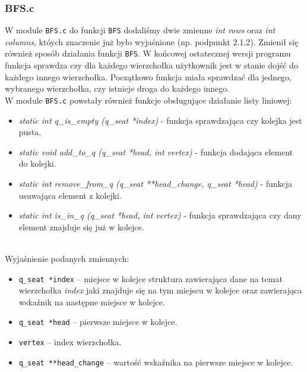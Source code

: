\documentclass[12pt, a4paper]{article}
\begin{document}
\subsubsection{BFS.c}
W module \texttt{BFS.c} do funkcji \texttt{BFS} dodaliśmy dwie zmienne \textit{int rows} oraz \textit{int columns}, któych znaczenie już było wyjaśnione (np. podpunkt 2.1.2). Zmienił się również sposób działania funkcji \texttt{BFS}. W końcowej ostatecznej wersji programu funkcja sprawdza czy dla każdego wierzchołka użytkownik jest w stanie dojść do każdego innego wierzchołka. Początkowo funkcja miała sprawdzać dla jednego, wybranego wierzchołka, czy istnieje droga do każdego innego.
\\
W module \texttt{BFS.c} powstały również funkcje obsługujące działanie listy liniowej:

\begin{itemize}
    \item \textit{static int q\_is\_empty (q\_seat *index)} - funkcja sprawdzająca czy kolejka jest pusta.
    \item \textit{static void add\_to\_q (q\_seat *head, int vertex)} - funkcja dodająca element do kolejki.
    \item \textit{static int remove\_from\_q (q\_seat **head\_change, q\_seat *head)} - funkcja usuwająca element z kolejki.
    \item \textit{static int is\_in\_q (q\_seat *head, int vertex)} - funkcja sprawdzająca czy dany element znajduje się już w kolejce.
\end{itemize}
\newpage
\\Wyjaśnienie podanych zmiennych:
\begin{itemize}
    \item \texttt{q\_seat *index} -- miejsce w kolejce  struktura zawierająca dane na temat wierzchołka \textit{index} jaki znajduje się na tym miejscu w kolejce oraz zawierająca wskaźnik na następne miejsce w kolejce.
    \item \texttt{q\_seat *head} -- pierwsze miejsce w kolejce.
    \item \texttt{vertex} -- index wierzchołka.
    \item \texttt{q\_seat **head\_change} -- wartość wskaźnika na pierwsze miejsce w kolejce.
\end{itemize}
\end{document}

